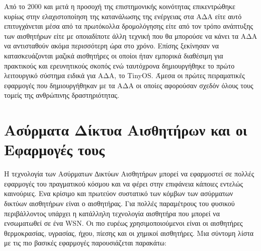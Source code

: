 Από το 2000 και μετά η προσοχή της επιστημονικής κοινότητας επικεντρώθηκε κυρίως στην ελαχιστοποίηση της κατανάλωσης της ενέργειας στα ΑΔΑ είτε αυτό επιτυγχάνεται
μέσα από τα πρωτόκολλα δρομολόγησης είτε από τον τρόπο ανάπτυξης των αισθητήρων είτε με οποιαδίποτε άλλη τεχνική που θα μπορούσε να κάνει τα ΑΔΑ να αντισταθούν ακόμα
περισσότερη ώρα στο χρόνο.
Επίσης ξεκίνησαν να κατασκευάζονται μαζικά αισθητήρες οι οποίοι ήταν εμπορικά διαθέσιμη για πρακτικούς και ερευνητικούς σκοπός ενώ ταυτόχρονα δημιουργήθηκε το πρώτο
λειτουργικό σύστημα ειδικά για ΑΔΑ, το TinyOS.
Άμεσα οι  πρώτες πειραματικές εφαρμογές που δημιουργήθηκαν με τα ΑΔΑ οι οποίες αφορούσαν σχεδόν όλους τους τομείς της ανθρώπινης δραστηριότητας.

\section{Ασύρματα Δίκτυα Αισθητήρων και οι Εφαρμογές τους}
Η τεχνολογία των Ασύρματων ∆ικτύων Αισθητήρων μπορεί να εφαρμοστεί σε πολλές εφαρμογές του πραγματικού κόσμου και να φέρει στην επιφάνεια κάποιες εντελώς καινούριες.
Ενα κρίσιμο και πρωτεύον συστατικό των κόμβων των ασύρματων δικτύων αισθητήρων είναι ο αισθητήρας.
Για πολλές παραμέτρους του φυσικού περιβάλλοντος υπάρχει η κατάλληλη τεχνολογία αισθητήρα που μπορεί να ενσωματωθεί σε ένα WSN.
Οι πιο ευρέως χρησιμοποιούμενοι είναι οι αισθητήρες θερμοκρασίας, υγρασίας, ήχου, πίεσης και οι χημικοί αισθητήρες.
Μια σύντομη λίστα με τις πιο βασικές εφαρμογές παρουσιάζεται παρακάτω:
